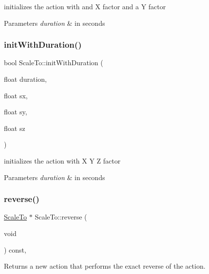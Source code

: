 initializes the action with and X factor and a Y factor 
\begin{DoxyParams}{Parameters}
{\em duration} & in seconds \\
\hline
\end{DoxyParams}
\mbox{\label{classScaleTo_aff69915e68ddbaa502d82a72e5787bf8}} 
\subsubsection{\texorpdfstring{init\+With\+Duration()}{initWithDuration()}\hspace{0.1cm}{\footnotesize\ttfamily [4/4]}}
{\footnotesize\ttfamily bool Scale\+To\+::init\+With\+Duration (\begin{DoxyParamCaption}\item[{float}]{duration,  }\item[{float}]{sx,  }\item[{float}]{sy,  }\item[{float}]{sz }\end{DoxyParamCaption})}

initializes the action with X Y Z factor 
\begin{DoxyParams}{Parameters}
{\em duration} & in seconds \\
\hline
\end{DoxyParams}
\mbox{\label{classScaleTo_a511d41e9e8a8b2ad3a751bb455912c03}} 
\subsubsection{\texorpdfstring{reverse()}{reverse()}\hspace{0.1cm}{\footnotesize\ttfamily [1/2]}}
{\footnotesize\ttfamily \hyperlink{classScaleTo}{Scale\+To} $\ast$ Scale\+To\+::reverse (\begin{DoxyParamCaption}\item[{void}]{ }\end{DoxyParamCaption}) const\hspace{0.3cm}{\ttfamily [override]}, {\ttfamily [virtual]}}

Returns a new action that performs the exact reverse of the action.

